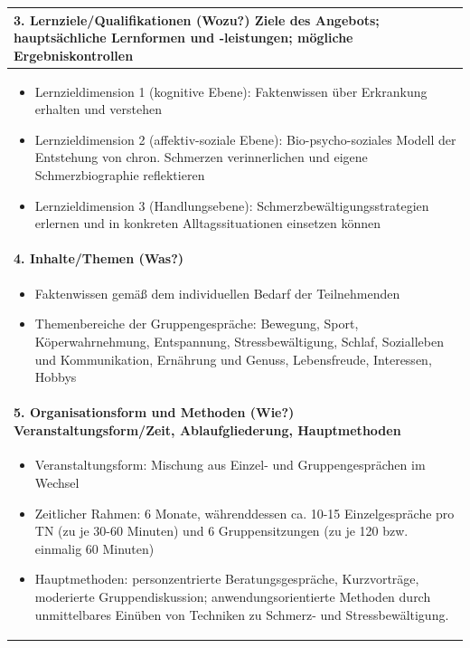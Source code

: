 \documentclass[
  twoside,
  parskip=half-,
]{scrreprt}
\begin{document}
\begin{center}
\begin{longtable}{p{}}
    \bfseries 3. Lernziele/Qualifikationen (Wozu?)\newline 
      Ziele des Angebots; hauptsächliche Lernformen und -leistungen; mögliche Ergebniskontrollen \\\hline
    \begin{itemize}[nosep, topsep=-10pt]
    \item Lernzieldimension 1 (kognitive Ebene): Faktenwissen über Erkrankung erhalten und verstehen
    \item Lernzieldimension 2 (affektiv-soziale Ebene): Bio-psycho-soziales Modell der Entstehung von chron. Schmerzen verinnerlichen und eigene Schmerzbiographie reflektieren
    \item Lernzieldimension 3 (Handlungsebene): Schmerzbewältigungsstrategien erlernen und in konkreten Alltagssituationen einsetzen können
    \end{itemize} \\\hline
    \bfseries 4. Inhalte/Themen (Was?) \\\hline
    \begin{itemize}[nosep, topsep=-10pt]
    \item Faktenwissen gemäß dem individuellen Bedarf der Teilnehmenden
    \item Themenbereiche der Gruppengespräche: 
    Bewegung, Sport, Köperwahrnehmung,
    Entspannung, Stressbewältigung, Schlaf,
    Sozialleben und Kommunikation,
    Ernährung und Genuss,
    Lebensfreude, Interessen, Hobbys
    \end{itemize} \\\hline
    \bfseries 5. Organisationsform und Methoden (Wie?) \newline
    Veranstaltungsform/Zeit, Ablaufgliederung, Hauptmethoden \\\hline
    \begin{itemize}[nosep, topsep=-10pt]
    \item Veranstaltungsform: Mischung aus Einzel- und Gruppengesprächen im Wechsel
    \item Zeitlicher Rahmen: 6 Monate, währenddessen ca. 10-15 Einzelgespräche pro TN (zu je 30-60 Minuten) und 6 Gruppensitzungen (zu je 120 bzw. einmalig 60 Minuten)
    \item Hauptmethoden: personzentrierte Beratungsgespräche, Kurzvorträge, moderierte Gruppendiskussion; anwendungsorientierte Methoden durch unmittelbares Einüben von Techniken zu Schmerz- und Stressbewältigung.
    \end{itemize} \\\hline

\end{longtable}
\end{center}
\end{document}
